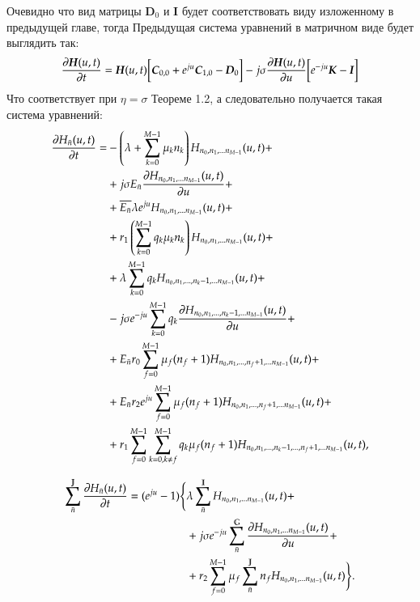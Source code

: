 Очевидно что вид матрицы \(\boldsymbol{D}_0\) и \(\boldsymbol{I}\) 
будет соответствовать виду изложенному в предыдущей главе, тогда
Предыдущая система уравнений в матричном виде будет выглядить так:
\begin{equation}
    \pdv{\boldsymbol{H}(u,t)}{t} =
    \boldsymbol{H}(u,t)\bigg[\boldsymbol{C}_{0,0} + e^{ju}\boldsymbol{C}_{1,0} - \boldsymbol{D}_{0}\bigg]
    -j\sigma\pdv{\boldsymbol{H}(u,t)}{u}\bigg[e^{-ju}\boldsymbol{K} - \boldsymbol{I}\bigg]
\end{equation}
Что соответствует при \(\eta = \sigma\) Теореме 1.2, а следовательно получается такая система уравнений:
\begin{equation}\begin{aligned} \label{HFirstEquationParticular}
\pdv{{H}_{\bar{n}}(u,t)}{t}=
    &-\left( {\lambda+\sum_{{k}=0}^{M-1}\mu_{k}{n}_{k}} \right){H}_{{n}_0, {n}_1, ... {n}_{M-1}}(u,t)+\\
    &+j \sigma E_{\bar{n}} \pdv{ {H}_{{n}_0, {n}_1, ... {n}_{M-1}} (u,t)}{u}(i,t) + \\
    &+\overline{E_{\bar{n}}} \lambda e^{ju} {H}_{{n}_0, {n}_1, ... {n}_{M-1}}(u,t)+\\
    &+r_1 \left( {\sum_{{k}=0}^{M-1} q_{k}\mu_{k}{n}_{k}} \right) {H}_{{n}_0, {n}_1, ... {n}_{M-1}}(u,t) + \\
    &+\lambda\sum_{k=0}^{M-1}q_k {H}_{{n}_0, {n}_1, ... , {n}_{k} - 1, ... {n}_{M-1}}(u,t) + \\
    &-j \sigma  e^{-ju} \sum_{k=0}^{M-1}q_k \pdv{ {H}_{{n}_0, {n}_1, ... , {n}_{k} - 1, ... {n}_{M-1}} (u,t)}{u} + \\
    &+E_{\bar{n}} r_0 \sum_{f=0}^{M-1} \mu_f (n_f + 1) {H}_{{n}_0, {n}_1, ... , {n}_{f} + 1, ... {n}_{M-1}}(u,t) + \\
    &+E_{\bar{n}} r_2 e^{ju} \sum_{f=0}^{M-1} \mu_f (n_f + 1) {H}_{{n}_0, {n}_1, ... , {n}_{f} + 1, ... {n}_{M-1}}(u,t) + \\
    &+r_1 \sum_{{f}=0}^{M-1} \sum_{{k}=0, {k} \neq {f}}^{M-1}
        q_k \mu_f (n_f+1) {H}_{{n}_0, {n}_1, ... , {n}_{k} - 1, ... , {n}_{f} + 1, ... {n}_{M-1}}(u,t),
\end{aligned}\end{equation}

\begin{equation}\begin{aligned}\label{HSecondEquationParticular}
\sum_{\bar{n}}^{\mathbb{J}} \pdv{{H}_{\bar{n}}(u,t)}{t}=(e^{ju} - 1)
\Bigg\{
    &\lambda \sum_{\bar{n}}^{\mathbb{I}} {H}_{{n}_0, {n}_1, ... {n}_{M-1}}(u,t)+\\
    &+j\sigma e^{-ju} \sum_{\bar{n}}^{\mathbb{G}}\pdv{ {H}_{{n}_0, {n}_1, ... {n}_{M-1}} (u,t)}{u} + \\
    &+r_2\sum_{f=0}^{M-1} \mu_f \sum_{\bar{n}}^{\mathbb{J}} n_f {H}_{{n}_0, {n}_1, ... {n}_{M-1}}(u,t)
\Bigg\}
.
\end{aligned}\end{equation}


